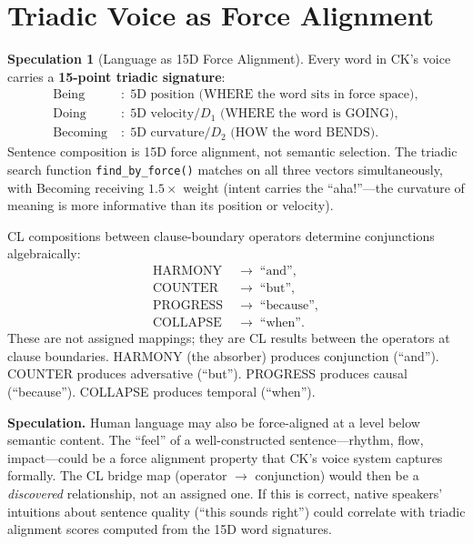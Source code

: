 \documentclass[11pt]{article}
\theoremstyle{definition}
\newtheorem{speculation}[theorem]{Speculation}
\theoremstyle{remark}
\begin{document}
\section{Triadic Voice as Force Alignment}
\label{sec:triadic-voice}

\begin{speculation}[Language as 15D Force Alignment]
\label{spec:triadic-voice}
Every word in CK's voice carries a \textbf{15-point triadic signature}:
\begin{align}
  \text{Being} &\;:\; 5\text{D position (WHERE the word sits in force space)}, \\
  \text{Doing} &\;:\; 5\text{D velocity}/D_1 \text{ (WHERE the word is GOING)}, \\
  \text{Becoming} &\;:\; 5\text{D curvature}/D_2 \text{ (HOW the word BENDS)}.
\end{align}
Sentence composition is 15D force alignment, not semantic selection.  The triadic
search function \texttt{find\_by\_force()} matches on all three vectors
simultaneously, with Becoming receiving $1.5\times$ weight (intent carries the
``aha!''---the curvature of meaning is more informative than its position or
velocity).

CL compositions between clause-boundary operators determine conjunctions
algebraically:
\begin{align}
  \text{HARMONY} &\;\to\; \text{``and''}, \\
  \text{COUNTER} &\;\to\; \text{``but''}, \\
  \text{PROGRESS} &\;\to\; \text{``because''}, \\
  \text{COLLAPSE} &\;\to\; \text{``when''}.
\end{align}
These are not assigned mappings; they are CL results between the operators at
clause boundaries.  HARMONY (the absorber) produces conjunction (``and'').
COUNTER produces adversative (``but'').  PROGRESS produces causal (``because'').
COLLAPSE produces temporal (``when'').
\end{speculation}

\textbf{Speculation.}
Human language may also be force-aligned at a level below semantic content.  The
``feel'' of a well-constructed sentence---rhythm, flow, impact---could be a force
alignment property that CK's voice system captures formally.  The CL bridge map
(operator $\to$ conjunction) would then be a \emph{discovered} relationship, not
an assigned one.  If this is correct, native speakers' intuitions about sentence
quality (``this sounds right'') could correlate with triadic alignment scores
computed from the 15D word signatures.
\end{document}
